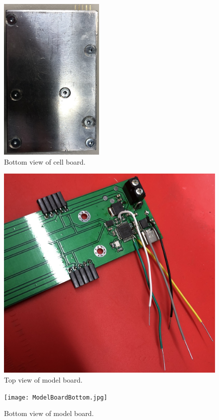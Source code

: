 \begin{figure}[ht!]
    \centering
    \includegraphics[width=0.45\textwidth]{CellBoardBottom.jpg}
    \caption{Bottom view of cell board.}
    \label{fig:CellBoardBottom}
\end{figure}

\begin{figure}[ht!]
    \centering
    \includegraphics[height=0.95\textheight]{ModelBoardTop.jpg}
    \caption{Top view of model board.}
    \label{fig:ModelBoardTop}
\end{figure}

\begin{figure}[h!]
    \centering
    \texttt{[image: ModelBoardBottom.jpg]}
    \caption{Bottom view of model board.}
    \label{fig:ModelBoardBottom}
\end{figure}
\FloatBarrier